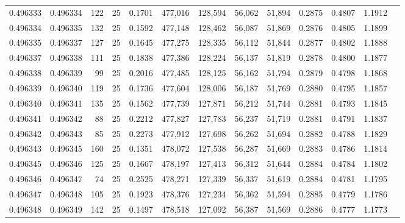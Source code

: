 \begin{tabular}{rrrrrrrrrrrrr}
0.496333 & 0.496334 &   122 &  25 &                                     0.1701 & 477,016 & 128,594 &  56,062 &  51,894 & 0.2875 & 0.4807 & 1.1912 \\
0.496334 & 0.496335 &   132 &  25 &                                     0.1592 & 477,148 & 128,462 &  56,087 &  51,869 & 0.2876 & 0.4805 & 1.1899 \\
0.496335 & 0.496337 &   127 &  25 &                                     0.1645 & 477,275 & 128,335 &  56,112 &  51,844 & 0.2877 & 0.4802 & 1.1888 \\
0.496337 & 0.496338 &   111 &  25 &                                     0.1838 & 477,386 & 128,224 &  56,137 &  51,819 & 0.2878 & 0.4800 & 1.1877 \\
0.496338 & 0.496339 &    99 &  25 &                                     0.2016 & 477,485 & 128,125 &  56,162 &  51,794 & 0.2879 & 0.4798 & 1.1868 \\
0.496339 & 0.496340 &   119 &  25 &                                     0.1736 & 477,604 & 128,006 &  56,187 &  51,769 & 0.2880 & 0.4795 & 1.1857 \\
0.496340 & 0.496341 &   135 &  25 &                                     0.1562 & 477,739 & 127,871 &  56,212 &  51,744 & 0.2881 & 0.4793 & 1.1845 \\
0.496341 & 0.496342 &    88 &  25 &                                     0.2212 & 477,827 & 127,783 &  56,237 &  51,719 & 0.2881 & 0.4791 & 1.1837 \\
0.496342 & 0.496343 &    85 &  25 &                                     0.2273 & 477,912 & 127,698 &  56,262 &  51,694 & 0.2882 & 0.4788 & 1.1829 \\
0.496343 & 0.496345 &   160 &  25 &                                     0.1351 & 478,072 & 127,538 &  56,287 &  51,669 & 0.2883 & 0.4786 & 1.1814 \\
0.496345 & 0.496346 &   125 &  25 &                                     0.1667 & 478,197 & 127,413 &  56,312 &  51,644 & 0.2884 & 0.4784 & 1.1802 \\
0.496346 & 0.496347 &    74 &  25 &                                     0.2525 & 478,271 & 127,339 &  56,337 &  51,619 & 0.2884 & 0.4781 & 1.1795 \\
0.496347 & 0.496348 &   105 &  25 &                                     0.1923 & 478,376 & 127,234 &  56,362 &  51,594 & 0.2885 & 0.4779 & 1.1786 \\
0.496348 & 0.496349 &   142 &  25 &                                     0.1497 & 478,518 & 127,092 &  56,387 &  51,569 & 0.2886 & 0.4777 & 1.1773 \\

\end{tabular}
